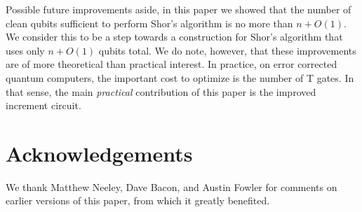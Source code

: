 \documentclass[twocolumn,longbibliography]{quantumarticle}
\begin{document}
Possible future improvements aside, in this paper we showed that the number of clean qubits sufficient to perform Shor's algorithm is no more than $n + O(1)$.
We consider this to be a step towards a construction for Shor's algorithm that uses only $n + O(1)$ qubits total.
We do note, however, that these improvements are of more theoretical than practical interest.
In practice, on error corrected quantum computers, the important cost to optimize is the number of T gates.
In that sense, the main {\em practical} contribution of this paper is the improved increment circuit.


\section{Acknowledgements}

We thank Matthew Neeley, Dave Bacon, and Austin Fowler for comments on earlier versions of this paper, from which it greatly benefited.




\end{document}
